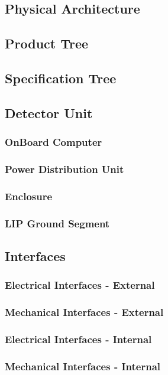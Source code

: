 \subsection{Physical Architecture}


\subsection{Product Tree}

\subsection{Specification Tree}

\subsection{Detector Unit}

\subsubsection{OnBoard Computer}

\subsubsection{Power Distribution Unit}

\subsubsection{Enclosure}

\subsubsection{LIP Ground Segment}

\subsection{Interfaces}

\subsubsection{Electrical Interfaces - External}

\subsubsection{Mechanical Interfaces - External}

\subsubsection{Electrical Interfaces - Internal}

\subsubsection{Mechanical Interfaces - Internal}